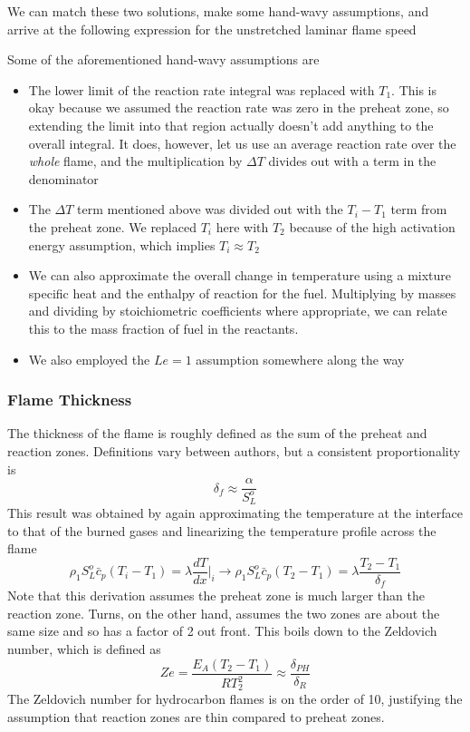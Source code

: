 \documentclass[11pt]{article}
\newcommand{\CenteredBoxed}[1]{\begin{center}\boxed{#1}\end{center}}
\begin{document}
We can match these two solutions, make some hand-wavy assumptions, and arrive at the following expression for the unstretched laminar flame speed
\CenteredBoxed{S_L^o = \sqrt{\frac{2\nu_f}{\rho_1Y_{f,1}}\bar\alpha\overline{RR}} \propto\sqrt{\bar\alpha\overline{RR}}\approx\sqrt{\frac{\bar\alpha}{\tau_{chem}}}}
Some of the aforementioned hand-wavy assumptions are
\begin{itemize}
\item The lower limit of the reaction rate integral was replaced with $T_1$. This is okay because we assumed the reaction rate was zero in the preheat zone, so extending the limit into that region actually doesn't add anything to the overall integral. It does, however, let us use an average reaction rate over the \emph{whole} flame, and the multiplication by $\Delta T$ divides out with a term in the denominator
\item The $\Delta T$ term mentioned above was divided out with the $T_i-T_1$ term from the preheat zone. We replaced $T_i$ here with $T_2$ because of the high activation energy assumption, which implies $T_i\approx T_2$
\item We can also approximate the overall change in temperature using a mixture specific heat and the enthalpy of reaction for the fuel. Multiplying by masses and dividing by stoichiometric coefficients where appropriate, we can relate this to the mass fraction of fuel in the reactants.
\item We also employed the $Le=1$ assumption somewhere along the way
\end{itemize}

\subsubsection{Flame Thickness}
The thickness of the flame is roughly defined as the sum of the preheat and reaction zones. Definitions vary between authors, but a consistent proportionality is
$$\delta_f\approx\frac{\alpha}{S_L^o}$$
This result was obtained by again approximating the temperature at the interface to that of the burned gases and linearizing the temperature profile across the flame
$$\rho_1S_L^o\bar c_p(T_i-T_1) =\lambda\frac{dT}{dx}\Big|_i\to\rho_1S_L^o\bar c_p(T_2-T_1)=\lambda\frac{T_2-T_1}{\delta_f}$$
Note that this derivation assumes the preheat zone is much larger than the reaction zone. Turns, on the other hand, assumes the two zones are about the same size and so has a factor of 2 out front. This boils down to the Zeldovich number, which is defined as
$$Ze =\frac{E_A(T_2-T_1)}{RT_2^2}\approx\frac{\delta_{PH}}{\delta_R}$$
The Zeldovich number for hydrocarbon flames is on the order of 10, justifying the assumption that reaction zones are thin compared to preheat zones.
\end{document}

